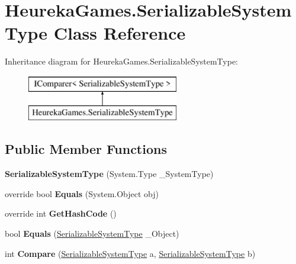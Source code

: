 \hypertarget{class_heureka_games_1_1_serializable_system_type}{}\section{Heureka\+Games.\+Serializable\+System\+Type Class Reference}
\label{class_heureka_games_1_1_serializable_system_type}
Inheritance diagram for Heureka\+Games.\+Serializable\+System\+Type\+:\begin{figure}[H]
\begin{center}
\leavevmode
\includegraphics[height=2.000000cm]{class_heureka_games_1_1_serializable_system_type}
\end{center}
\end{figure}
\subsection*{Public Member Functions}
\begin{DoxyCompactItemize}
\item 
\mbox{\label{class_heureka_games_1_1_serializable_system_type_a17958e2f513e4440bd37b44008332225}} 
{\bfseries Serializable\+System\+Type} (System.\+Type \+\_\+\+System\+Type)
\item 
\mbox{\label{class_heureka_games_1_1_serializable_system_type_ae3711684f8765fe3fbe554367af1dd3b}} 
override bool {\bfseries Equals} (System.\+Object obj)
\item 
\mbox{\label{class_heureka_games_1_1_serializable_system_type_a69fe783c4eedf7f418522425776b0e49}} 
override int {\bfseries Get\+Hash\+Code} ()
\item 
\mbox{\label{class_heureka_games_1_1_serializable_system_type_a07c5f6ea6758b1c3f90a8ca07228249e}} 
bool {\bfseries Equals} (\hyperlink{class_heureka_games_1_1_serializable_system_type}{Serializable\+System\+Type} \+\_\+\+Object)
\item 
\mbox{\label{class_heureka_games_1_1_serializable_system_type_a3d50b72dd5a7bf58ac735f73ae2611a6}} 
int {\bfseries Compare} (\hyperlink{class_heureka_games_1_1_serializable_system_type}{Serializable\+System\+Type} a, \hyperlink{class_heureka_games_1_1_serializable_system_type}{Serializable\+System\+Type} b)
\end{DoxyCompactItemize}
